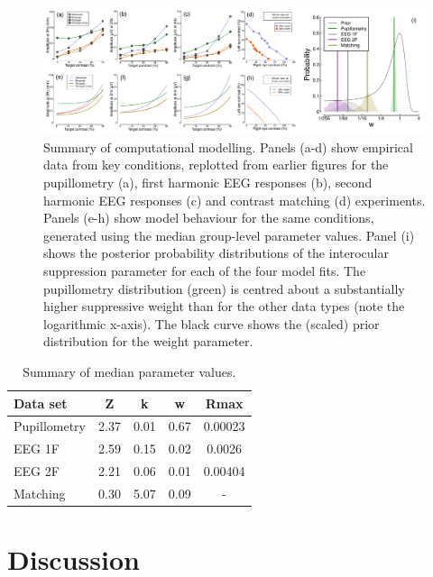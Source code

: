 \documentclass[
]{article}
\begin{document}
\begin{figure}

{\centering \includegraphics{Figures/modelfigure} 

}

\caption{Summary of computational modelling. Panels (a-d) show empirical data from key conditions, replotted from earlier figures for the pupillometry (a), first harmonic EEG responses (b), second harmonic EEG responses (c) and contrast matching (d) experiments. Panels (e-h) show model behaviour for the same conditions, generated using the median group-level parameter values.  Panel (i) shows the posterior probability distributions of the interocular suppression parameter for each of the four model fits. The pupillometry distribution (green) is centred about a substantially higher suppressive weight than for the other data types (note the logarithmic x-axis). The black curve shows the (scaled) prior distribution for the weight parameter.}\label{fig:modelfigure}
\end{figure}

\begin{table}

\caption{\label{tab:paramtable}Summary of median parameter values.}
\centering
\begin{tabular}[t]{l|c|c|c|c}
\hline
Data set & Z & k & w & Rmax\\
\hline
Pupillometry & 2.37 & 0.01 & 0.67 & 0.00023\\
\hline
EEG 1F & 2.59 & 0.15 & 0.02 & 0.0026\\
\hline
EEG 2F & 2.21 & 0.06 & 0.01 & 0.00404\\
\hline
Matching & 0.30 & 5.07 & 0.09 & -\\
\hline
\end{tabular}
\end{table}

\hypertarget{discussion}{%
\section{Discussion}\label{discussion}}
\end{document}
